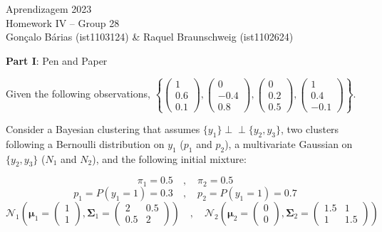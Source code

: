 \documentclass[12pt]{article}
\newcommand{\ind}{\perp\!\!\!\perp}
\begin{document}
\begin{center}
  \large{Aprendizagem 2023} \\
  Homework IV -- Group 28 \\
  \vskip 0.3cm
  Gonçalo Bárias (ist1103124) \& Raquel Braunschweig (ist1102624)\vskip 1cm

  \large{\textbf{Part I}: Pen and Paper}\normalsize
\end{center}

\noindent Given the following observations, $\left\{\begin{pmatrix} 1 \\ 0.6 \\ 0.1 \end{pmatrix}, \begin{pmatrix} 0 \\ -0.4 \\ 0.8 \end{pmatrix}, \begin{pmatrix} 0 \\ 0.2 \\ 0.5 \end{pmatrix},
  \begin{pmatrix} 1 \\ 0.4 \\ -0.1 \end{pmatrix}\right\}$.

\vskip 0.2cm
\noindent Consider a Bayesian clustering that assumes $\{y_1\} \ind \{y_2, y_3\}$, two clusters following a Bernoulli distribution on $y_1$ ($p_1$ and $p_2$), a multivariate Gaussian on $\{y_2, y_3\}$ ($N_1$ and $N_2$),
and the following initial mixture:

\vskip -0.3cm
\begin{equation*}
  \pi_1 = 0.5 \quad , \quad \pi_2 = 0.5
\end{equation*}
\begin{equation*}
  p_1 = P(y_1 = 1) = 0.3 \quad , \quad p_2 = P(y_1 = 1) = 0.7
\end{equation*}
\begin{equation*}
  \mathcal{N}_1 \left(\boldsymbol{\mu}_1 = \begin{pmatrix} 1 \\ 1 \end{pmatrix}, \mathbf{\Sigma}_1 = \begin{pmatrix} 2 & 0.5 \\ 0.5 & 2 \end{pmatrix}\right) \quad
  , \quad \mathcal{N}_2 \left(\boldsymbol{\mu}_2 = \begin{pmatrix} 0 \\ 0 \end{pmatrix}, \mathbf{\Sigma}_2 = \begin{pmatrix} 1.5 & 1 \\ 1 & 1.5 \end{pmatrix}\right)
\end{equation*}
\end{document}
